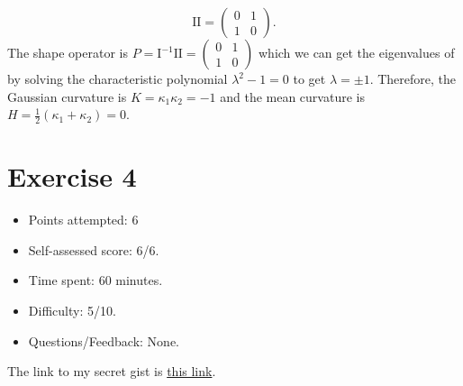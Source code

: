 \documentclass[12pt]{article}
\begin{document}
\begin{enumerate}
\[          \mathrm{I\!I} = \begin{pmatrix} 0 & 1 \\ 1 & 0 \end{pmatrix}.
        \]
        The shape operator is \(P = \mathrm{I}^{-1}\mathrm{I\!I}=\begin{pmatrix}
          0 & 1 \\ 1 & 0
        \end{pmatrix}\) which we can get the eigenvalues of by solving the characteristic polynomial \(\lambda^2 - 1 = 0\) to get \(\lambda = \pm 1\). Therefore, the Gaussian curvature is \(K = \kappa_1\kappa_2 = -1\) and the mean curvature is \(H = \frac{1}{2} (\kappa_1 + \kappa_2) = 0\).
\end{enumerate}

\section*{Exercise 4}
\begin{itemize}
  \item Points attempted: 6
  \item Self-assessed score: 6/6.
  \item Time spent: 60 minutes.
  \item Difficulty: 5/10.
  \item Questions/Feedback: None.
\end{itemize}

The link to my secret gist is \href{https://gist.github.com/JAvalosCalPoly/285404d0c1cad0ff6f40e93ab47a80b3}{this link}.
\pagebreak
\end{document}
